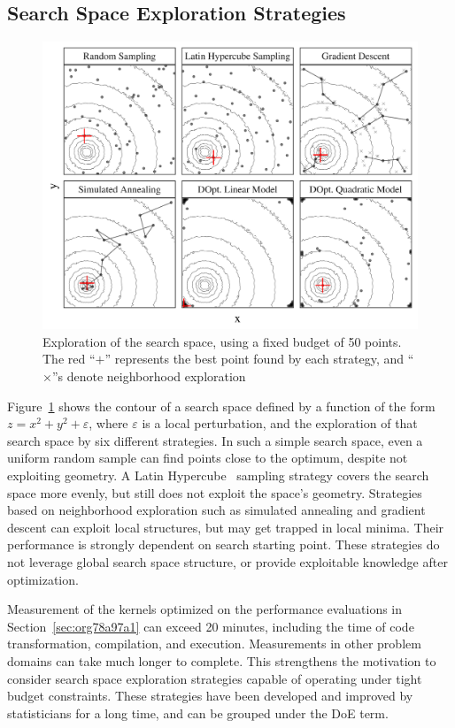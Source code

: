 \documentclass[conference]{IEEEtran}
\begin{document}
\subsection{Search Space Exploration Strategies}
\label{sec:org8db703a}
\begin{figure}[b]
\centering
\includegraphics[width=.95\columnwidth]{./img/sampling_comparison.pdf}
\caption{\label{fig:org3efa01e}
Exploration of the search space, using a fixed budget of 50 points. The red ``\(+\)'' represents the best point found by each strategy, and ``\(\times\)''s denote neighborhood exploration}
\end{figure}

Figure~\ref{fig:org3efa01e} shows the contour of a search space defined
by a function of the form \(z = x^2 + y^2 + \varepsilon\), where \(\varepsilon\) is
a local perturbation, and the exploration of that search space by six different
strategies. In such a simple search space, even a uniform random sample can find
points close to the optimum, despite not exploiting geometry. A Latin
Hypercube~\cite{carnell2018lhs} sampling strategy covers the search space
more evenly, but still does not exploit the space's geometry. Strategies based on
neighborhood exploration such as simulated annealing and gradient descent can
exploit local structures, but may get trapped in local minima. Their
performance is strongly dependent on search starting point. These strategies do
not leverage global search space structure, or provide exploitable knowledge
after optimization.

Measurement of the kernels optimized on the performance evaluations in
Section~\ref{sec:org78a97a1} can exceed 20 minutes, including the time
of code transformation, compilation, and execution. Measurements in other
problem domains can take much longer to complete. This strengthens the
motivation to consider search space exploration strategies capable of operating
under tight budget constraints. These strategies have been developed and
improved by statisticians for a long time, and can be grouped under the DoE
term.
\end{document}
